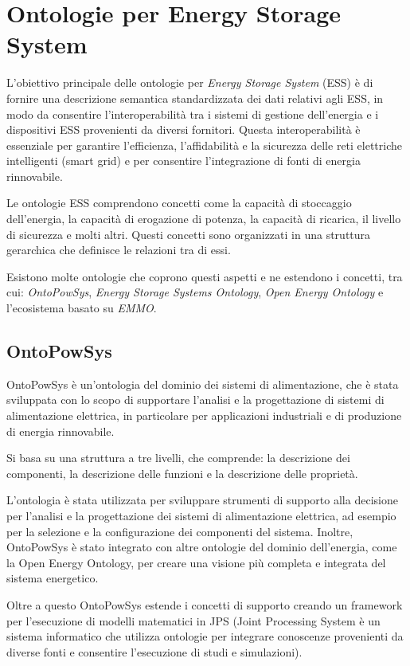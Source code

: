 \chapter{Ontologie per Energy Storage System}

L'obiettivo principale delle ontologie per \textit{Energy Storage System} (ESS)
è di fornire una descrizione
semantica standardizzata dei dati relativi agli ESS, in modo da consentire
l'interoperabilità tra i sistemi di gestione dell'energia e i dispositivi ESS
provenienti da diversi fornitori. Questa interoperabilità è essenziale per
garantire l'efficienza, l'affidabilità e la sicurezza delle reti elettriche
intelligenti (smart grid) e per consentire l'integrazione di fonti di energia
rinnovabile.

Le ontologie ESS comprendono concetti come la capacità di stoccaggio
dell'energia, la capacità di erogazione di potenza, la capacità di ricarica, il
livello di sicurezza e
molti altri. Questi concetti sono organizzati in una struttura gerarchica che
definisce le relazioni tra di essi.

Esistono molte ontologie che coprono questi aspetti e ne estendono i concetti,
tra cui: \textit{OntoPowSys}, \textit{Energy Storage Systems Ontology},
\textit{Open Energy Ontology} e l'ecosistema basato su \textit{EMMO}.

\section{OntoPowSys}
OntoPowSys \cite{OntoPowSys} è un'ontologia del dominio dei sistemi di
alimentazione, che è stata
sviluppata con lo scopo di supportare l'analisi e la progettazione di sistemi
di alimentazione elettrica, in particolare per applicazioni industriali e di
produzione di energia rinnovabile.

Si basa su una struttura a tre livelli, che comprende:
la descrizione dei componenti, la descrizione delle funzioni e la descrizione
delle proprietà.

L'ontologia è stata utilizzata per sviluppare strumenti di supporto alla
decisione per l'analisi e la progettazione dei sistemi di alimentazione
elettrica, ad esempio per la selezione e la configurazione dei componenti del
sistema. Inoltre, OntoPowSys è stato integrato con altre ontologie del dominio
dell'energia, come la Open Energy Ontology, per creare una visione più completa
e integrata del sistema energetico.

Oltre a questo OntoPowSys estende i concetti di supporto creando un framework per l'esecuzione
di modelli matematici in JPS (Joint Processing System è un sistema informatico
che
utilizza ontologie per integrare conoscenze provenienti da diverse fonti e
consentire l'esecuzione di studi e simulazioni).

